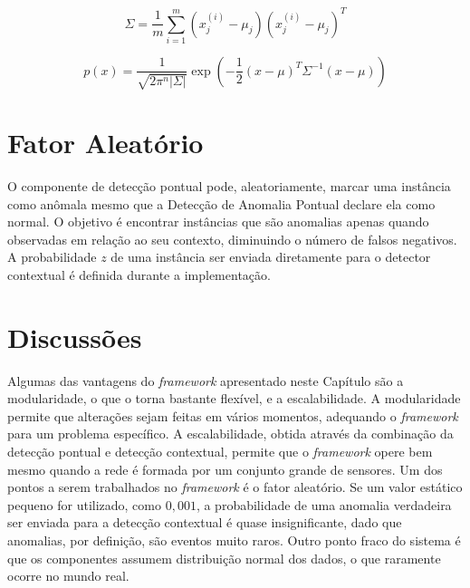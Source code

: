 \documentclass[cic,tc]{iiufrgs}
\begin{document}
\begin{equation}
    \label{multi_var}
    \Sigma = \frac{1}{m} \sum_{i=1}^{m} (x_j^{(i)} - \mu_j)(x_j^{(i)} - \mu_j)^T
\end{equation}

\begin{equation}
    \label{multi_pdf}
    p(x) = \frac{1}{\sqrt{2\pi^{n}|\Sigma|}}\exp{(-\frac{1}{2}(x - \mu)^T\Sigma^{-1}(x - \mu))}
\end{equation}

\section{Fator Aleatório}
\label{fator_aleatorio}
O componente de detecção pontual pode, aleatoriamente, marcar uma instância como anômala mesmo que a Detecção de Anomalia Pontual declare ela como normal. O objetivo é encontrar instâncias que são anomalias apenas quando observadas em relação ao seu contexto, diminuindo o número de falsos negativos. A probabilidade $z$ de uma instância ser enviada diretamente para o detector contextual é definida durante a implementação.

\section{Discussões}
Algumas das vantagens do \textit{framework} apresentado neste Capítulo são a modularidade, o que o torna bastante flexível, e a escalabilidade. A modularidade permite que alterações sejam feitas em vários momentos, adequando o \textit{framework} para um problema específico. A escalabilidade, obtida através da combinação da detecção pontual e detecção contextual, permite que o \textit{framework} opere bem mesmo quando a rede é formada por um conjunto grande de sensores. Um dos pontos a serem trabalhados no \textit{framework} é o fator aleatório. Se um valor estático pequeno for utilizado, como $0,001$, a probabilidade de uma anomalia verdadeira ser enviada para a detecção contextual é quase insignificante, dado que anomalias, por definição, são eventos muito raros. Outro ponto fraco do sistema é que os componentes assumem distribuição normal dos dados, o que raramente ocorre no mundo real.

\end{document}
